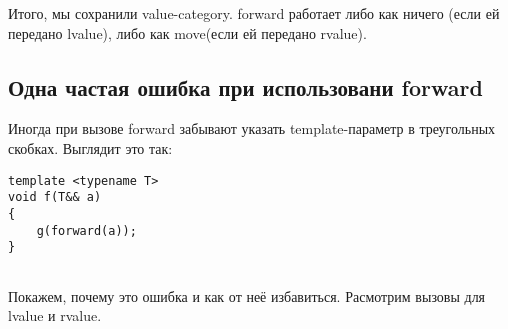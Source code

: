 	Итого, мы сохранили value-category. forward работает либо как ничего (если ей передано lvalue), либо как move(если ей передано rvalue).

\subsection{Одна частая ошибка при использовани forward}
	Иногда при вызове forward забывают указать template-параметр в треугольных скобках. Выглядит это так:

\begin{verbatim}
template <typename T>
void f(T&& a)
{
    g(forward(a));
}


\end{verbatim}

	Покажем, почему это ошибка и как от неё избавиться. Расмотрим вызовы для lvalue и rvalue.

